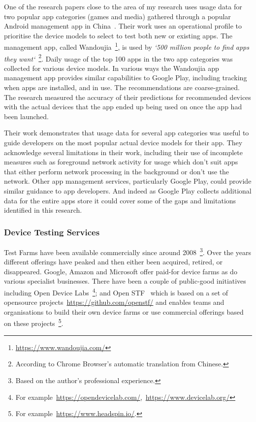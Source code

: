 One of the research papers close to the area of my research uses usage data for two popular app categories (games and media) gathered through a popular Android management app in China~\citep{lu2016_PRADA}. Their work uses an operational profile to prioritise the device models to select to test both new or existing apps. The management app, called Wandoujia~\footnote{\url{https://www.wandoujia.com/}}, is used by \emph{`500 million people to find apps they want`}~\footnote{According to Chrome Browser's automatic translation from Chinese.}. Daily usage of the top 100 apps in the two app categories was collected for various device models. In various ways the Wandoujia app management app provides similar capabilities to Google Play, including tracking when apps are installed, and in use. The recommendations are coarse-grained. The research measured the accuracy of their predictions for recommended devices with the actual devices that the app ended up being used on once the app had been launched. 

Their work demonstrates that usage data for several app categories was useful to guide developers on the most popular actual device models for their app. They acknowledge several limitations in their work, including their use of incomplete measures such as foreground network activity for usage which don't suit apps that either perform network processing in the background or don't use the network. Other app management services, particularly Google Play, could provide similar guidance to app developers. And indeed as Google Play collects additional data for the entire apps store it could cover some of the gaps and limitations identified in this research.


\subsubsection{Device Testing Services}
Test Farms have been available commercially since around 2008~\footnote{Based on the author's professional experience.}. Over the years different offerings have peaked and then either been acquired, retired, or disappeared. Google, Amazon and Microsoft offer paid-for device farms as do various specialist businesses. There have been a couple of public-good initiatives including Open Device Labs~\footnote{For example~\url{https://opendevicelab.com/},~\url{https://www.devicelab.org/}}; and Open STF~\cite{openstf_website} which is based on a set of opensource projects~\url{https://github.com/openstf/} and enables teams and organisations to build their own device farms or use commercial offerings based on these projects~\footnote{For example~\url{https://www.headspin.io/}.}.


